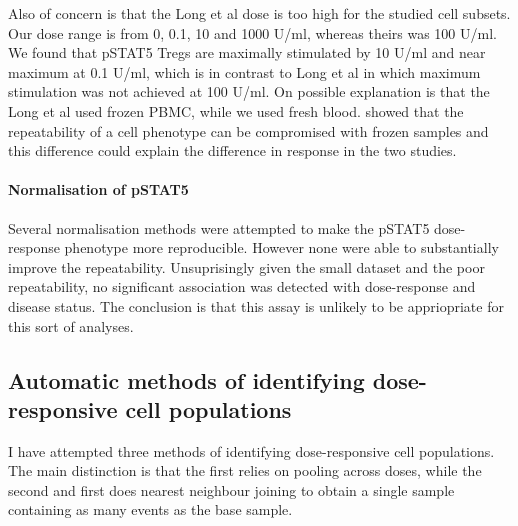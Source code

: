 Also of concern is that the Long et al dose is too high for the studied cell subsets.
Our dose range is from 0, 0.1, 10 and 1000 U/ml, whereas theirs was 100 U/ml.
We found that pSTAT5 Tregs are maximally stimulated by 10 U/ml and near maximum at 0.1 U/ml,
which is in contrast to Long et al in which maximum stimulation was not achieved at 100 U/ml.
On possible explanation is that the Long et al used frozen \gls{PBMC}, while we used fresh blood.
\cite{Dendrou:2009dv} showed that the repeatability of a cell phenotype can be compromised with frozen samples
and this difference could explain the difference in response in the two studies.






\paragraph{Normalisation of pSTAT5}

Several normalisation methods were attempted to make the pSTAT5 dose-response phenotype more reproducible.
However none were able to substantially improve the repeatability.
Unsuprisingly given the small dataset and the poor repeatability, no significant association was detected with dose-response
and disease status.
The conclusion is that this assay is unlikely to be appriopriate for this sort of analyses.


\subsection{ Automatic methods of identifying dose-responsive cell populations }

I have attempted three methods of identifying dose-responsive cell populations.
The main distinction is that the first relies on pooling across doses, while the second and first does nearest neighbour joining to obtain a single sample
containing as many events as the base sample.

